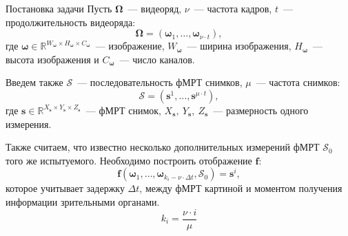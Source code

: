 \documentclass[9pt,pdf]{beamer} %
\begin{document}
\begin{frame}{Постановка задачи}
Пусть $\bm{\Omega}$~--- видеоряд, $\nu$~--- частота кадров, $t$~--- продолжительность видеоряда:
\begin{equation}
    \bm{\Omega} = (\bm{\omega}_{1}, \dots, \bm{\omega}_{\nu \cdot t}),
\end{equation}
где $\bm{\omega} \in \mathbb{R}^{W_{\bm{\omega}} \times H_{\bm{\omega}} \times C_{\bm{\omega}}}$~--- изображение, $W_{\bm{\omega}}$~---
ширина изображения, $H_{\bm{\omega}}$~--- высота изображения и $C_{\bm{\omega}}$~--- число каналов.

Введем также $\mathcal{S}$~--- последовательность фМРТ снимков,  $\mu$~--- частота снимков:
\begin{equation}
    \mathcal{S} = (\bm{s}^{1}, \dots, \bm{s}^{\mu \cdot t}),
\end{equation}
где $\bm{s} \in \mathbb{R}^{X_{\bm{s}} \times Y_{\bm{s}} \times Z_{\bm{s}}}$~--- фМРТ снимок, $X_{\bm{s}},~Y_{\bm{s}},~Z_{\bm{s}}$~--- размерность одного измерения.

Также считаем, что известно несколько дополнительных измерений фМРТ $\mathcal{S}_0$ того же испытуемого.
Необходимо построить отображение $\bm{f}$:
\begin{equation}
    \bm{f}(\bm{\omega}_{1}, \dots, \bm{\omega}_{k_i - \nu \cdot \Delta t}, \mathcal{S}_0) = \bm{s}^i,
\end{equation}
которое учитывает задержку $\Delta t$, между фМРТ картиной и моментом получения информации зрительными органами.
\begin{equation}
    \label{k_i}
    k_i = \dfrac{\nu \cdot i}{\mu}
\end{equation}
\end{frame}
\end{document}
